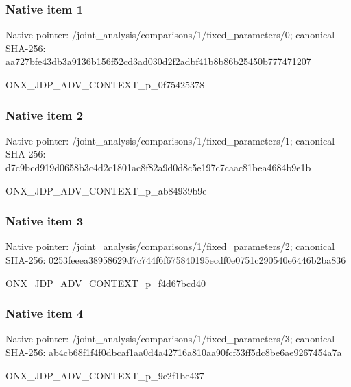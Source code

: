 \documentclass[10pt,a4paper]{article}
\begin{document}
\subsubsection{Native item 1}
Native pointer: /joint\_\allowbreak{}analysis/comparisons/1/fixed\_\allowbreak{}parameters/0; canonical SHA-256: aa727bfe43db3a9136b156f52cd3ad030d2f2adbf41b8b86b25450b777471207

\begingroup\raggedright\sloppy ONX\_\allowbreak{}JDP\_\allowbreak{}ADV\_\allowbreak{}CONTEXT\_\allowbreak{}p\_\allowbreak{}0f75425378\par\endgroup

\subsubsection{Native item 2}
Native pointer: /joint\_\allowbreak{}analysis/comparisons/1/fixed\_\allowbreak{}parameters/1; canonical SHA-256: d7c9bcd919d0658b3c4d2c1801ac8f82a9d0d8c5e197c7caac81bea4684b9e1b

\begingroup\raggedright\sloppy ONX\_\allowbreak{}JDP\_\allowbreak{}ADV\_\allowbreak{}CONTEXT\_\allowbreak{}p\_\allowbreak{}ab84939b9e\par\endgroup

\subsubsection{Native item 3}
Native pointer: /joint\_\allowbreak{}analysis/comparisons/1/fixed\_\allowbreak{}parameters/2; canonical SHA-256: 0253feeea38958629d7c744f6f675840195ecdf0e0751c290540e6446b2ba836

\begingroup\raggedright\sloppy ONX\_\allowbreak{}JDP\_\allowbreak{}ADV\_\allowbreak{}CONTEXT\_\allowbreak{}p\_\allowbreak{}f4d67bcd40\par\endgroup

\subsubsection{Native item 4}
Native pointer: /joint\_\allowbreak{}analysis/comparisons/1/fixed\_\allowbreak{}parameters/3; canonical SHA-256: ab4cb68f1f4f0dbcaf1aa0d4a42716a810aa90fcf53ff5dc8be6ae9267454a7a

\begingroup\raggedright\sloppy ONX\_\allowbreak{}JDP\_\allowbreak{}ADV\_\allowbreak{}CONTEXT\_\allowbreak{}p\_\allowbreak{}9e2f1be437\par\endgroup
\end{document}
